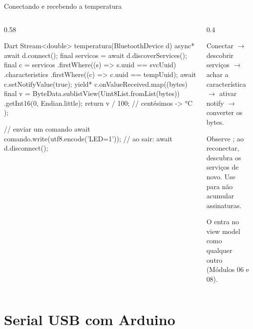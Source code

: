 \documentclass[aspectratio=169,10pt]{beamer}
\begin{document}
\begin{frame}[fragile]{Conectando e recebendo a temperatura}
  \begin{columns}[T]
    \begin{column}{0.58\textwidth}
\begin{codigo}[title=Notify vira Stream<double>]{Dart}
Stream<double> temperatura(BluetoothDevice d) async* {
  await d.connect();
  final servicos = await d.discoverServices();
  final c = servicos
      .firstWhere((s) => s.uuid == svcUuid)
      .characteristics
      .firstWhere((c) => c.uuid == tempUuid);
  await c.setNotifyValue(true);
  yield* c.onValueReceived.map((bytes) {
    final v = ByteData.sublistView(Uint8List.fromList(bytes))
        .getInt16(0, Endian.little);
    return v / 100;                 // centésimos -> °C
  });
}

// enviar um comando
await comando.write(utf8.encode('LED=1'));
// ao sair: await d.disconnect();
\end{codigo}
    \end{column}
    \begin{column}{0.4\textwidth}
      \begin{conceito}[Fluxo]
        Conectar $\rightarrow$ descobrir serviços $\rightarrow$ achar a característica $\rightarrow$ ativar notify $\rightarrow$ converter os bytes.
      \end{conceito}
      \begin{atencao}[Desconexões]
        Observe ; ao reconectar, descubra os serviços de novo. Use  para não acumular assinaturas.
      \end{atencao}
      \begin{dica}
        O  entra no view model como qualquer outro (Módulos 06 e 08).
      \end{dica}
    \end{column}
  \end{columns}
\end{frame}

\section{Serial USB com Arduino}
\end{document}
